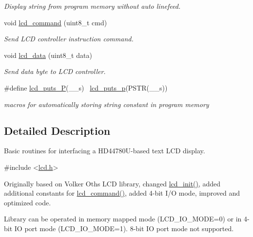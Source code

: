 \begin{DoxyCompactItemize}
\begin{DoxyCompactList}\small\item\em Display string from program memory without auto linefeed. \end{DoxyCompactList}\item 
void \hyperlink{group__pfleury__lcd_gaea9d14f02df06f948cb5a56776980826}{lcd\+\_\+command} (uint8\+\_\+t cmd)
\begin{DoxyCompactList}\small\item\em Send L\+CD controller instruction command. \end{DoxyCompactList}\item 
void \hyperlink{group__pfleury__lcd_gad0729d2cba627825a089ca1fff12ba29}{lcd\+\_\+data} (uint8\+\_\+t data)
\begin{DoxyCompactList}\small\item\em Send data byte to L\+CD controller. \end{DoxyCompactList}\item 
\#define \hyperlink{group__pfleury__lcd_gad2895d544df6664f2b5500f2e7991911}{lcd\+\_\+puts\+\_\+P}(\+\_\+\+\_\+s)              ~\hyperlink{group__pfleury__lcd_ga9022a24a56a9b15681f62eb6ba77e5de}{lcd\+\_\+puts\+\_\+p}(P\+S\+TR(\+\_\+\+\_\+s))
\begin{DoxyCompactList}\small\item\em macros for automatically storing string constant in program memory \end{DoxyCompactList}\end{DoxyCompactItemize}


\subsection{Detailed Description}
Basic routines for interfacing a H\+D44780\+U-\/based text L\+CD display. 


\begin{DoxyCode}
\textcolor{preprocessor}{#include <\hyperlink{lcd_8h}{lcd.h}>} 
\end{DoxyCode}


Originally based on Volker Oth\textquotesingle{}s L\+CD library, changed \hyperlink{group__pfleury__lcd_ga9af28b2779326b63ff4356e2b1828984}{lcd\+\_\+init()}, added additional constants for \hyperlink{group__pfleury__lcd_gaea9d14f02df06f948cb5a56776980826}{lcd\+\_\+command()}, added 4-\/bit I/O mode, improved and optimized code.

Library can be operated in memory mapped mode (L\+C\+D\+\_\+\+I\+O\+\_\+\+M\+O\+DE=0) or in 4-\/bit IO port mode (L\+C\+D\+\_\+\+I\+O\+\_\+\+M\+O\+DE=1). 8-\/bit IO port mode not supported.

